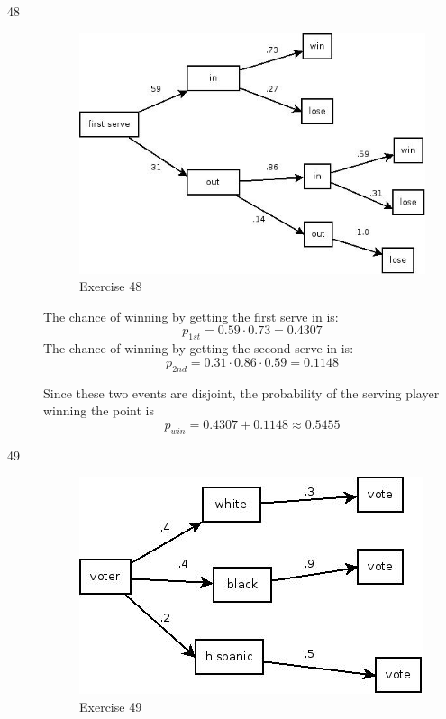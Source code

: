 \documentclass[letterpaper]{exam}
\begin{document}
\begin{description}
    \item[48]
      \begin{figure}[H]
        \centering
        \includegraphics[scale = 0.4]{ex48.jpg}
        \caption{Exercise 48}
      \end{figure}

      The chance of winning by getting the first serve in is:
      \[
        p_{1st} = 0.59 \cdot 0.73 = 0.4307
      \]
      The chance of winning by getting the second serve in is:
      \[
        p_{2nd} = 0.31 \cdot 0.86 \cdot 0.59 = 0.1148
      \]

      Since these two events are disjoint, the probability of the serving player
      winning the point is
      \[
        p_{win} = 0.4307 + 0.1148 \approx \boxed{ 0.5455 }
      \]

    \item[49]
      \begin{figure}[H]
        \centering
        \includegraphics[scale = 0.4]{ex49.jpg}
        \caption{Exercise 49}
      \end{figure}


\end{description}
\end{document}
